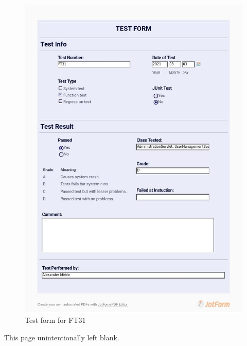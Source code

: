 \documentclass{article}
\begin{document}
 \begin{figure}
     \centering
     \includegraphics[width=13cm]{images/2021-03-03_Alexander_FT31_001}
     \renewcommand\figurename{Figure}
     \caption{Test form for FT31}
     \label{fig:my_label}
 \end{figure}


\newpage
\begin{flushleft}
\end{flushleft}

\vspace*{\fill}
                \hfill
                \begin{center}
                This page unintentionally left blank.
                \end{center}
                \vspace{\fill}
                \thispagestyle{empty}
\end{document}
